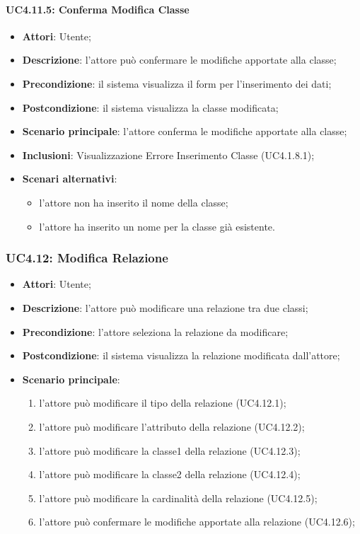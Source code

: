 \paragraph{UC4.11.5: Conferma Modifica Classe}
\label{UC4.11.5}
\begin{itemize}
\item \textbf{Attori}: Utente;
\item \textbf{Descrizione}: l'attore può confermare le modifiche apportate alla classe;
\item \textbf{Precondizione}: il sistema visualizza il form per l'inserimento dei dati;	
\item \textbf{Postcondizione}: il sistema visualizza la classe modificata;	
\item \textbf{Scenario principale}:
l'attore conferma le modifiche apportate alla classe;	
\item \textbf{Inclusioni}:
Visualizzazione Errore Inserimento Classe (UC4.1.8.1);
\item \textbf{Scenari alternativi}:
\begin{itemize}
\item l'attore non ha inserito il nome della classe;
\item l'attore ha inserito un nome per la classe già esistente.
\end{itemize}
\end{itemize}

\subsubsection{UC4.12: Modifica Relazione}
\label{UC4.12}
\begin{itemize}
\item \textbf{Attori}: Utente;
\item \textbf{Descrizione}: l'attore può modificare una relazione tra due classi;	
\item \textbf{Precondizione}: l'attore seleziona la relazione da modificare;	
\item \textbf{Postcondizione}: il sistema visualizza la relazione modificata dall'attore;	
\item \textbf{Scenario principale}:
\begin{enumerate}
\item l'attore può modificare il tipo della relazione (UC4.12.1);
\item l'attore può modificare l'attributo della relazione (UC4.12.2);
\item l'attore può modificare la classe1 della relazione (UC4.12.3);
\item l'attore può modificare la classe2 della relazione (UC4.12.4);
\item l'attore può modificare la cardinalità della relazione (UC4.12.5); 
\item l'attore può confermare le modifiche apportate alla relazione (UC4.12.6);

\end{enumerate}	
\end{itemize}

